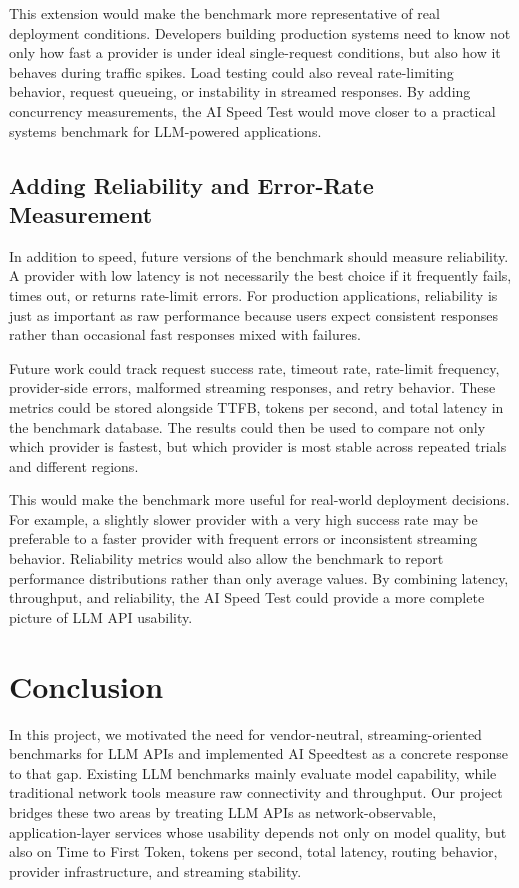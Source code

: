 \documentclass[11pt, a4paper]{article}
\begin{document}
This extension would make the benchmark more representative of real deployment conditions. Developers building production systems need to know not only how fast a provider is under ideal single-request conditions, but also how it behaves during traffic spikes. Load testing could also reveal rate-limiting behavior, request queueing, or instability in streamed responses. By adding concurrency measurements, the AI Speed Test would move closer to a practical systems benchmark for LLM-powered applications.

\subsection{Adding Reliability and Error-Rate Measurement}

In addition to speed, future versions of the benchmark should measure reliability. A provider with low latency is not necessarily the best choice if it frequently fails, times out, or returns rate-limit errors. For production applications, reliability is just as important as raw performance because users expect consistent responses rather than occasional fast responses mixed with failures.

Future work could track request success rate, timeout rate, rate-limit frequency, provider-side errors, malformed streaming responses, and retry behavior. These metrics could be stored alongside TTFB, tokens per second, and total latency in the benchmark database. The results could then be used to compare not only which provider is fastest, but which provider is most stable across repeated trials and different regions.

This would make the benchmark more useful for real-world deployment decisions. For example, a slightly slower provider with a very high success rate may be preferable to a faster provider with frequent errors or inconsistent streaming behavior. Reliability metrics would also allow the benchmark to report performance distributions rather than only average values. By combining latency, throughput, and reliability, the AI Speed Test could provide a more complete picture of LLM API usability.

\section{Conclusion}
In this project, we motivated the need for vendor-neutral, streaming-oriented benchmarks for LLM APIs and implemented AI Speedtest as a concrete response to that gap. Existing LLM benchmarks mainly evaluate model capability, while traditional network tools measure raw connectivity and throughput. Our project bridges these two areas by treating LLM APIs as network-observable, application-layer services whose usability depends not only on model quality, but also on Time to First Token, tokens per second, total latency, routing behavior, provider infrastructure, and streaming stability.
\end{document}
